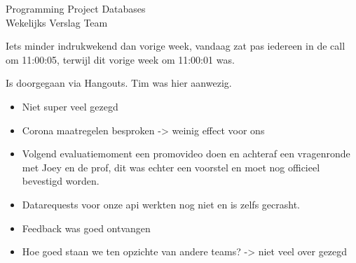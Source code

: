 \documentclass{article}
\newcounter{team}
\begin{document}

	\begin{Minutes}{Programming Project Databases \\ Wekelijks Verslag Team }
		\missingNoExcuse{/}
		\missingExcused{/}

		\maketitle

		    Iets minder indrukwekend dan vorige week, vandaag zat pas iedereen in de call om 11:00:05, terwijl dit vorige week om 11:00:01 was.

    		Is doorgegaan via Hangouts. Tim was hier aanwezig.
    		\begin{itemize}
    		    \item Niet super veel gezegd
    		    \item Corona maatregelen besproken -> weinig effect voor ons
    		    \item Volgend evaluatiemoment een promovideo doen en achteraf een vragenronde met Joey en de prof, dit was echter een voorstel en moet nog officieel bevestigd worden.
    		    \item Datarequests voor onze api werkten nog niet en is zelfs gecrasht.
    		    \item Feedback was goed ontvangen
    		    \item Hoe goed staan we ten opzichte van andere teams? -> niet veel over gezegd
    		\end{itemize}




\end{Minutes}
\end{document}
